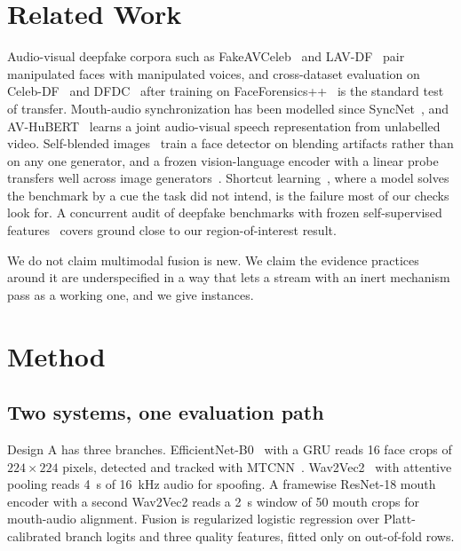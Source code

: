 \documentclass[conference]{IEEEtran}
\begin{document}
\section{Related Work}

Audio-visual deepfake corpora such as FakeAVCeleb~\cite{fakeavceleb} and
LAV-DF~\cite{lavdf} pair manipulated faces with manipulated voices, and
cross-dataset evaluation on Celeb-DF~\cite{celebdf} and DFDC~\cite{dfdc} after
training on FaceForensics++~\cite{ffpp} is the standard test of transfer.
Mouth-audio synchronization has been modelled since SyncNet~\cite{syncnet},
and AV-HuBERT~\cite{avhubert} learns a joint audio-visual speech
representation from unlabelled video. Self-blended images~\cite{sbi} train a
face detector on blending artifacts rather than on any one generator, and a
frozen vision-language encoder with a linear probe transfers well across image
generators~\cite{univfd}. Shortcut learning~\cite{shortcut}, where a model
solves the benchmark by a cue the task did not intend, is the failure most of
our checks look for. A concurrent audit of deepfake benchmarks with frozen
self-supervised features~\cite{audit} covers ground close to our
region-of-interest result.

We do not claim multimodal fusion is new. We claim the evidence practices
around it are underspecified in a way that lets a stream with an inert
mechanism pass as a working one, and we give instances.

\section{Method}

\subsection{Two systems, one evaluation path}

Design A has three branches. EfficientNet-B0~\cite{efficientnet} with a GRU
reads 16 face crops of $224\times224$ pixels, detected and tracked with
MTCNN~\cite{mtcnn}. Wav2Vec2~\cite{wav2vec2} with attentive pooling reads 4~s
of 16~kHz audio for spoofing. A framewise ResNet-18 mouth encoder with a
second Wav2Vec2 reads a 2~s window of 50 mouth crops for mouth-audio
alignment. Fusion is regularized logistic regression over Platt-calibrated
branch logits and three quality features, fitted only on out-of-fold rows.
\end{document}
